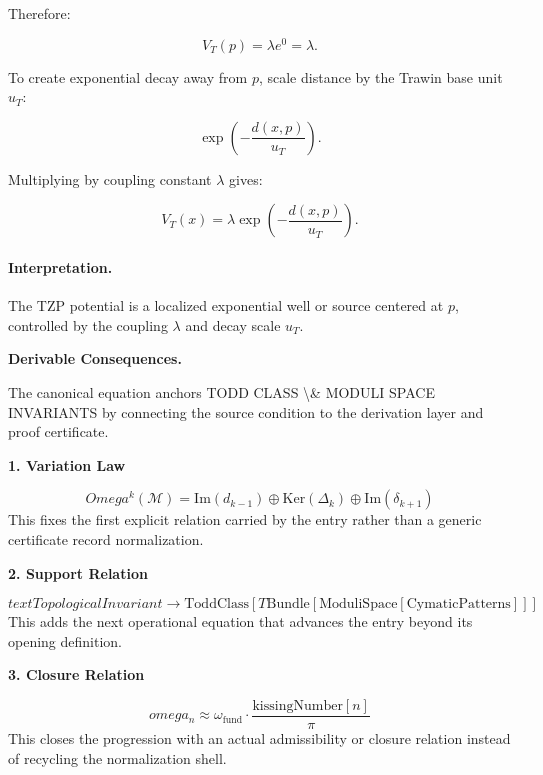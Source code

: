 Therefore:

\begin{equation}
V_T(p)=\lambda e^0=\lambda .
\end{equation}

To create exponential decay away from $p$, scale distance by the Trawin base unit $u_T$:

\begin{equation}
\exp\left(-\frac{d(x,p)}{u_T}\right).
\end{equation}

Multiplying by coupling constant $\lambda$ gives:

\begin{equation}
\boxed{
V_T(x)
=
\lambda
\exp\left(
-\frac{d(x,p)}{u_T}
\right).
}
\end{equation}

\paragraph{Interpretation.}
The TZP potential is a localized exponential well or source centered at $p$, controlled by the coupling $\lambda$ and decay scale $u_T$.

\par\vspace{0.35em}
\noindent\textbf{Derivable Consequences.}\quad
\begingroup
\footnotesize
\raggedright
The canonical equation anchors TODD CLASS \textbackslash{}\& MODULI SPACE INVARIANTS by connecting the source condition to the derivation layer and proof certificate.
\par\endgroup

\noindent\textbf{1. Variation Law}\par
\[
Omega^k(\mathcal{M}) = \text{Im}(d_{k-1}) \oplus \text{Ker}(\Delta_k) \oplus \text{Im}(\delta_{k+1})
\]
\noindent This fixes the first explicit relation carried by the entry rather than a generic certificate record normalization.\par
\noindent\textbf{2. Support Relation}\par
\[
text{TopologicalInvariant} \to \text{ToddClass}[T\text{Bundle}[\text{ModuliSpace}[\text{CymaticPatterns}]]]
\]
\noindent This adds the next operational equation that advances the entry beyond its opening definition.\par
\noindent\textbf{3. Closure Relation}\par
\[
omega_n \approx \omega_{\text{fund}} \cdot \frac{\text{kissingNumber}[n]}{\pi}
\]
\noindent This closes the progression with an actual admissibility or closure relation instead of recycling the normalization shell.\par

